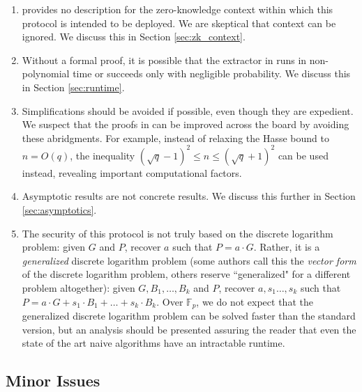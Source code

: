 \documentclass{article}
\theoremstyle{definition}
\newcommand{\Fp}{\mathbb{F}_p}
\newcommand{\6}{\mathbf}
\newcommand{\7}{\mathcal}
\begin{document}
\begin{enumerate}
    
    \item \cite{BassaSoundnessIPDL} provides no description for the zero-knowledge context within which this protocol is intended to be deployed. We are skeptical that context can be ignored. We discuss this in Section \ref{sec:zk_context}. 


    \item Without a formal proof, it is possible that the extractor in \cite{BassaSoundnessIPDL} runs in non-polynomial time or succeeds only with negligible probability. We discuss this in Section \ref{sec:runtime}. 

    \item Simplifications should be avoided if possible, even though they are expedient. 
    We suspect that the proofs in \cite{BassaSoundnessIPDL} can be improved across the board by avoiding these abridgments. For example, instead of relaxing the Hasse bound to $n = O(q)$, the inequality $(\sqrt{q} - 1)^2 \leq n \leq (\sqrt{q} + 1)^2$ can be used instead, revealing important computational factors. 
    
    \item Asymptotic results are not concrete results. We discuss this further in Section \ref{sec:asymptotics}. 
    
    \item  The security of this protocol is not truly based on the discrete logarithm problem: given $G$ and $P$, recover $a$ such that $P = a \cdot G$. Rather, it is a \textit{generalized} discrete logarithm problem (some authors call this the \textit{vector form} of the discrete logarithm problem, others reserve ``generalized" for a different problem altogether): given $G, B_1, \dots, B_k$ and $P$, recover $a, s_1 \dots, s_k$ such that $P = a \cdot G + s_1 \cdot B_1 + \dots + s_k \cdot B_k$. Over $\Fp$, we do not expect that the generalized discrete logarithm problem can be solved faster than the standard version, but an analysis should be presented assuring the reader that even the state of the art naive algorithms have an intractable runtime. %

\end{enumerate}






\subsection{Minor Issues}\label{sec:min}
\end{document}
